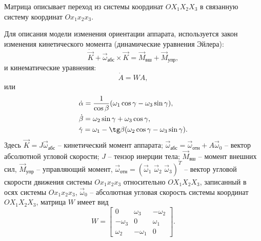 Матрица описывает переход из системы координат $OX_1X_2X_3$ в связанную систему
координат $Ox_1x_2x_3$.\par
\noindent\indent Для описания модели изменения ориентации аппарата, используется
закон изменения кинетического момента (динамические уравнения Эйлера):
\begin{equation}\label{eq:EulerDynamic}
    \dot{\vec{K}} + \vec{\omega}_{\text{абс}} \times \vec{K} = \vec{M}_{\text{вш}} + \vec{M}_{\text{упр}},
\end{equation}
и кинематические уравнения:
\begin{equation}\label{eq:EulerKinematic}
    \dot{A} = WA,
\end{equation}
или
\begin{equation}
    \begin{aligned}
        & \dot{\alpha} = \frac{1}{\cos\beta}(\omega_1\cos\gamma - \omega_3\sin\gamma), \\
        & \dot{\beta} = \omega_2\sin\gamma + \omega_3\cos\gamma, \\
        & \dot{\gamma} = \omega_1 - \tg\beta(\omega_2\cos\gamma - \omega_3\sin\gamma).
    \end{aligned}
\end{equation}
Здесь $\vec{K} = J\vec{\omega}_{\text{абс}}$ -- кинетический момент аппарата;
$\vec{\omega}_{\text{абс}} = \vec{\omega}_{\text{отн}} + A\vec{\omega}_0$ -- вектор
абсолютной угловой скорости; $J$ -- тензор инерции тела; $\vec{M}_{\text{вш}}$ --
момент внешних сил, $\vec{M}_{\text{упр}}$ -- управляющий момент,
$\vec{\omega}_{\text{отн}} = (\vec{\omega}_1\,\, \vec{\omega}_2\,\, \vec{\omega}_3)^T$ --
вектор угловой скорости движения системы $Ox_1x_2x_3$ относительно $OX_1X_2X_3$,
записанный в осях системы $Ox_1x_2x_3$, $\vec{\omega}_0$ -- абсолютная угловая
скорость системы координат $OX_1X_2X_3$, матрица $W$ имеет вид
\begin{equation}
    W = \begin{bmatrix}
        0 & \omega_3 & -\omega_2 \\
        -\omega_3 & 0 & \omega_1 \\
        \omega_2 & -\omega_1 & 0
    \end{bmatrix}.
\end{equation}
%
